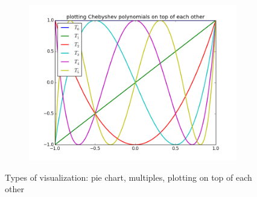 \begin{figure}
\begin{subfigure}{.3\textwidth}
\end{subfigure}
\begin{subfigure}{.3\textwidth}
\centering
\includegraphics[width=\textwidth]{PoT.png}
\end{subfigure}
\caption{Types of visualization: pie chart, multiples, plotting on top of each other}
\label{fig:visTypes3}
\end{figure}


